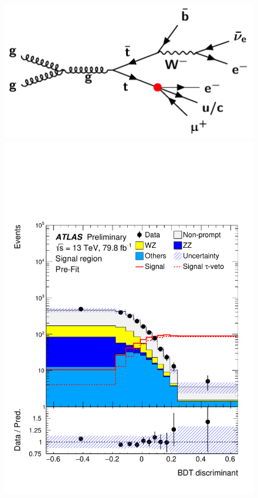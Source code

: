 \begin{figure}[tbh!]
 \begin{center}
 \begin{minipage}[b]{0.325\linewidth} 
 \includegraphics[width=\textwidth]{figures/Part3/History/TT} 
 \vspace{2em}
 \end{minipage}
 \hfill
 \begin{minipage}[b]{0.325\linewidth} 
 \includegraphics[width=\textwidth]{figures/Part3/History/ATLAS_results1}

\end{minipage}
\end{center}
\end{figure}
